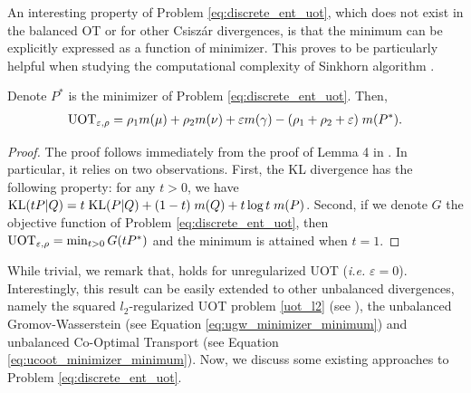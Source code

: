 An interesting property of Problem \eqref{eq:discrete_ent_uot}, which does not exist in the
balanced OT or for other Csiszár divergences,
is that the minimum can be explicitly expressed as a function of minimizer.
This proves to be particularly helpful when studying the computational complexity of
Sinkhorn algorithm \citep{Khiem20}.
\begin{lemma}
  \label{eq:uot_minimizer}
Denote $P^*$ is the minimizer of Problem \eqref{eq:discrete_ent_uot}. Then,
\begin{align}
  \text{UOT}_{\varepsilon, \rho} = \rho_1 m(\mu) + \rho_2 m(\nu) + \varepsilon m(\gamma)
  - (\rho_1 + \rho_2 + \varepsilon) \; m(P^*).
\end{align}
\end{lemma}
\begin{proof}
  The proof follows immediately from the proof of Lemma 4 in \citep{Khiem20}. In particular,
  it relies on two observations. First, the KL divergence has the following property:
  for any $t > 0$, we have $\text{KL}(t P | Q) = t \; \text{KL}(P | Q) + (1-t) \; m(Q) + t \log t \; m(P)$.
  Second, if we denote $G$ the objective function of Problem \eqref{eq:discrete_ent_uot}, then
  $\text{UOT}_{\varepsilon, \rho} = \min_{t > 0} G(tP^*)$ and the minimum is attained when $t=1$.
\end{proof}
While trivial, we remark that,  holds for unregularized UOT
(\textit{i.e.} $\varepsilon = 0$). Interestingly, this result can be easily extended
to other unbalanced divergences, namely
the squared $l_2$-regularized UOT problem \eqref{uot_l2} (see ),
the unbalanced Gromov-Wasserstein (see Equation \eqref{eq:ugw_minimizer_minimum})
and unbalanced Co-Optimal Transport (see Equation \eqref{eq:ucoot_minimizer_minimum}).
Now, we discuss some existing approaches to Problem \eqref{eq:discrete_ent_uot}.

